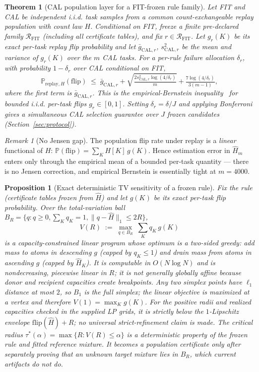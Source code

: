 \documentclass{article}
\newtheorem{theorem}{Theorem}
\newtheorem{proposition}{Proposition}
\theoremstyle{definition}
\theoremstyle{remark}
\newtheorem{remark}{Remark}
\newcommand{\flip}{\mathrm{flip}}
\newcommand{\calD}{\mathrm{CAL}}
\renewcommand{\P}{\mathbb{P}}
\begin{document}
\begin{theorem}[CAL population layer for a FIT-frozen rule family]
\label{thm:pop}
Let FIT and CAL be independent i.i.d. task samples from a common
count-exchangeable replay population with count law $H$. Conditional on FIT,
freeze a finite pre-declared family $\mathcal R_{\mathrm{FIT}}$ (including all
certificate tables), and fix $r\in\mathcal R_{\mathrm{FIT}}$. Let $g_r(K)$ be
its exact per-task replay flip probability and let $\bar g_{\calD,r}$,
$s^2_{\calD,r}$ be the mean and variance of $g_r(K)$ over the $m$ CAL tasks.
For a per-rule failure allocation $\delta_r$, with probability
$1-\delta_r$ over CAL conditional on FIT,
\[
\P_{\text{replay},H}(\flip) \;\le\; \bar g_{\calD,r}
+ \sqrt{\tfrac{2 s^2_{\calD,r}\log(4/\delta_r)}{m}}
+ \tfrac{7\log(4/\delta_r)}{3(m-1)},
\]
where the first term is $\bar g_{\calD,r}$.  This is the
empirical-Bernstein inequality~\citep{maurer2009eb} for bounded i.i.d.
per-task flips $g_r\in[0,1]$. Setting $\delta_r=\delta/J$ and applying
Bonferroni gives a simultaneous CAL selection guarantee over $J$ frozen
candidates (Section~\ref{sec:protocol}).
\end{theorem}
\begin{remark}[No Jensen gap]
The population flip rate under replay is a \emph{linear} functional of $H$:
$\P(\flip)=\sum_K H[K]\,g(K)$. Hence estimation error in $\widehat H_m$ enters
only through the empirical mean of a bounded per-task quantity --- there is no
Jensen correction, and empirical Bernstein is essentially tight at $m=4000$.
\end{remark}
\begin{proposition}[Exact deterministic TV sensitivity of a frozen rule]
\label{prop:tv}
Fix the rule (certificate tables frozen from $\widehat H$) and let $g(K)$ be
its exact per-task flip probability. Over the total-variation ball
$B_R=\{q:q\ge0,\sum_K q_K=1,\|q-\widehat H\|_1\le 2R\}$,
\[
V(R)\;:=\;\max_{q\in B_R}\;\textstyle\sum_K q_K\,g(K)
\]
is a capacity-constrained linear program whose optimum is a two-sided greedy:
add mass to atoms in descending $g$ (capped by $q_K\le1$) and drain mass from
atoms in ascending $g$ (capped by $\widehat H_K$). It is computable in
$O(N\log N)$ and is nondecreasing, piecewise linear in $R$; it is not
generally globally affine because donor and recipient capacities create
breakpoints. Any two simplex points have $\ell_1$ distance at most $2$, so
$B_1$ is the full simplex; the linear objective is maximized at a vertex and
therefore $V(1)=\max_K g(K)$. For the positive radii and realized capacities checked in the
supplied LP grids, it is strictly below the $1$-Lipschitz envelope
$\flip(\widehat H)+R$; no universal strict-refinement claim is made. The
\emph{critical radius} $\tau^*(\alpha)=\max\{R:V(R)\le\alpha\}$ is a
deterministic property of the frozen rule and fitted reference mixture. It
becomes a population certificate only after separately proving that an unknown
target mixture lies in $B_R$, which current artifacts do not do.
\end{proposition}
\end{document}
